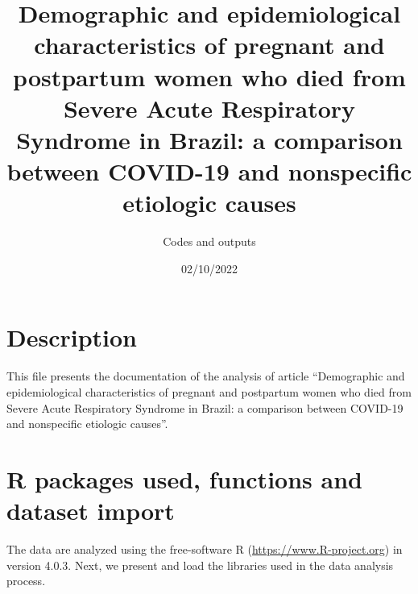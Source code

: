 \documentclass[
]{article}
\title{Demographic and epidemiological characteristics of pregnant and
postpartum women who died from Severe Acute Respiratory Syndrome in
Brazil: a comparison between COVID-19 and nonspecific etiologic causes}
\author{Codes and outputs}
\date{02/10/2022}
\begin{document}
\maketitle

{
\setcounter{tocdepth}{1}
\tableofcontents
}
\newpage

\hypertarget{description}{%
\section{Description}\label{description}}

This file presents the documentation of the analysis of article
``Demographic and epidemiological characteristics of pregnant and
postpartum women who died from Severe Acute Respiratory Syndrome in
Brazil: a comparison between COVID-19 and nonspecific etiologic
causes''.

\hypertarget{r-packages-used-functions-and-dataset-import}{%
\section{R packages used, functions and dataset
import}\label{r-packages-used-functions-and-dataset-import}}

The data are analyzed using the free-software R
(\url{https://www.R-project.org}) in version 4.0.3. Next, we present and
load the libraries used in the data analysis process.
\end{document}
